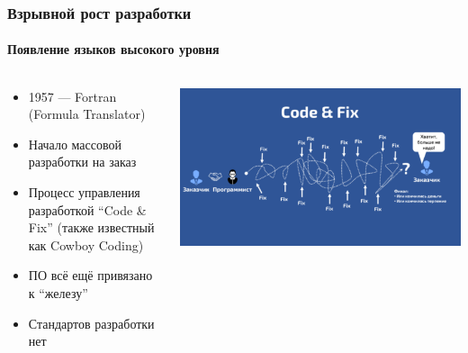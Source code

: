 \documentclass{../../slides-style}
\begin{document}
    \begin{frame}
        \frametitle{Взрывной рост разработки}
        \framesubtitle{Появление языков высокого уровня}
        \begin{columns}
            \begin{column}{0.5\textwidth}
                \begin{itemize}
                    \item 1957 --- Fortran (Formula Translator) 
                    \item Начало массовой разработки на заказ
                    \item Процесс управления разработкой ``Code \& Fix'' (также известный как Cowboy Coding)
                    \item ПО всё ещё привязано к ``железу''
                    \item Стандартов разработки нет
                \end{itemize}
            \end{column}
            \begin{column}{0.5\textwidth}
                \begin{center}
                    \includegraphics[width=\textwidth]{codeAndFix.png}
                \end{center}
            \end{column}
        \end{columns}
    \end{frame}
\end{document}
